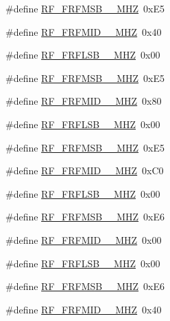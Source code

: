 \begin{DoxyCompactItemize}
\item 
\#define \mbox{\hyperlink{sx1276_regs-_fsk_8h_a34b7c4220125ea6aa40f38ac71fc8eab}{R\+F\+\_\+\+F\+R\+F\+M\+S\+B\+\_\+\_\+\+M\+HZ}}~0x\+E5
\item 
\#define \mbox{\hyperlink{sx1276_regs-_fsk_8h_a1bceebac3751bf54d8cc4e4320514a3e}{R\+F\+\_\+\+F\+R\+F\+M\+I\+D\+\_\+\_\+\+M\+HZ}}~0x40
\item 
\#define \mbox{\hyperlink{sx1276_regs-_fsk_8h_aab684a457bd2e8952dc0f8940715bfe9}{R\+F\+\_\+\+F\+R\+F\+L\+S\+B\+\_\+\_\+\+M\+HZ}}~0x00
\item 
\#define \mbox{\hyperlink{sx1276_regs-_fsk_8h_a78d8d7e3f4451c2badb7f3359916d743}{R\+F\+\_\+\+F\+R\+F\+M\+S\+B\+\_\+\_\+\+M\+HZ}}~0x\+E5
\item 
\#define \mbox{\hyperlink{sx1276_regs-_fsk_8h_a1546e90f6f3410863a32080331820bbf}{R\+F\+\_\+\+F\+R\+F\+M\+I\+D\+\_\+\_\+\+M\+HZ}}~0x80
\item 
\#define \mbox{\hyperlink{sx1276_regs-_fsk_8h_a9ff02de3ac5b8834425db22bd9c08aa0}{R\+F\+\_\+\+F\+R\+F\+L\+S\+B\+\_\+\_\+\+M\+HZ}}~0x00
\item 
\#define \mbox{\hyperlink{sx1276_regs-_fsk_8h_aa5948b0994ec297dab348596c157f83e}{R\+F\+\_\+\+F\+R\+F\+M\+S\+B\+\_\+\_\+\+M\+HZ}}~0x\+E5
\item 
\#define \mbox{\hyperlink{sx1276_regs-_fsk_8h_aa290b930290cc4e553b4ab66ae76110d}{R\+F\+\_\+\+F\+R\+F\+M\+I\+D\+\_\+\_\+\+M\+HZ}}~0x\+C0
\item 
\#define \mbox{\hyperlink{sx1276_regs-_fsk_8h_a5015a2c3439f35865780ba16fefb1493}{R\+F\+\_\+\+F\+R\+F\+L\+S\+B\+\_\+\_\+\+M\+HZ}}~0x00
\item 
\#define \mbox{\hyperlink{sx1276_regs-_fsk_8h_ac8513596ed36e9470cbeb19a1e8e9951}{R\+F\+\_\+\+F\+R\+F\+M\+S\+B\+\_\+\_\+\+M\+HZ}}~0x\+E6
\item 
\#define \mbox{\hyperlink{sx1276_regs-_fsk_8h_ac4e4c5efd901db32fc8ba24c6875d05f}{R\+F\+\_\+\+F\+R\+F\+M\+I\+D\+\_\+\_\+\+M\+HZ}}~0x00
\item 
\#define \mbox{\hyperlink{sx1276_regs-_fsk_8h_a43714471acd2a688c20cdd6b5eedaa35}{R\+F\+\_\+\+F\+R\+F\+L\+S\+B\+\_\+\_\+\+M\+HZ}}~0x00
\item 
\#define \mbox{\hyperlink{sx1276_regs-_fsk_8h_a3b3f235e4db9c9622527591ca7916c87}{R\+F\+\_\+\+F\+R\+F\+M\+S\+B\+\_\+\_\+\+M\+HZ}}~0x\+E6
\item 
\#define \mbox{\hyperlink{sx1276_regs-_fsk_8h_a0ac29b7ceadd42ee420ff9edfe9e8e79}{R\+F\+\_\+\+F\+R\+F\+M\+I\+D\+\_\+\_\+\+M\+HZ}}~0x40

\end{DoxyCompactItemize}
